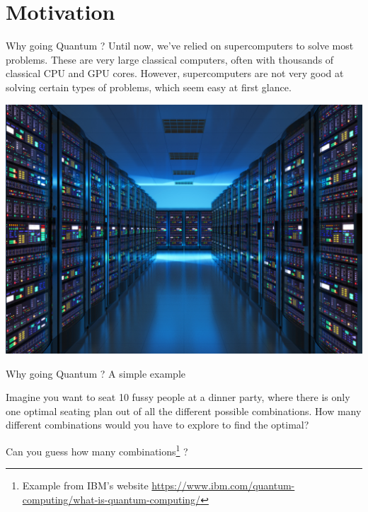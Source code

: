 \graphicspath{{assets/motivation/}}

\section[Motivation]{Motivation}

\begin{frame}{Why going Quantum ?}
	Until now, we’ve relied on supercomputers to solve most problems. These are very large classical computers, often with thousands of classical CPU and GPU cores. However, supercomputers are not very good at solving certain types of problems, which seem easy at first glance. 
	
	\begin{center}
	    \includegraphics[width=.75\linewidth, height=.55\textheight]{server-room}
	\end{center}
\end{frame}

\begin{frame}{Why going Quantum ? A simple example}
	
Imagine you want to seat 10 fussy people at a dinner party, where there is only one optimal seating plan out of all the different possible combinations. How many different combinations would you have to explore to find the optimal?

Can you guess how many \alert{combinations}\footnote{Example from IBM's website \url{https://www.ibm.com/quantum-computing/what-is-quantum-computing/}} ?
\end{frame}


